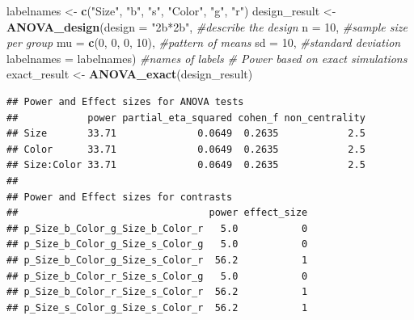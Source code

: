 \documentclass[]{book}
\newenvironment{Shaded}{\begin{snugshade}}{\end{snugshade}}
\newcommand{\CommentTok}[1]{\textcolor[rgb]{0.56,0.35,0.01}{\textit{#1}}}
\newcommand{\DataTypeTok}[1]{\textcolor[rgb]{0.13,0.29,0.53}{#1}}
\newcommand{\DecValTok}[1]{\textcolor[rgb]{0.00,0.00,0.81}{#1}}
\newcommand{\KeywordTok}[1]{\textcolor[rgb]{0.13,0.29,0.53}{\textbf{#1}}}
\newcommand{\NormalTok}[1]{#1}
\newcommand{\OperatorTok}[1]{\textcolor[rgb]{0.81,0.36,0.00}{\textbf{#1}}}
\newcommand{\StringTok}[1]{\textcolor[rgb]{0.31,0.60,0.02}{#1}}
\begin{document}
\begin{Shaded}
\begin{Highlighting}[]
\NormalTok{labelnames <-}\StringTok{ }\KeywordTok{c}\NormalTok{(}\StringTok{"Size"}\NormalTok{, }\StringTok{"b"}\NormalTok{, }\StringTok{"s"}\NormalTok{, }\StringTok{"Color"}\NormalTok{, }\StringTok{"g"}\NormalTok{, }\StringTok{"r"}\NormalTok{)}
\NormalTok{design_result <-}\StringTok{ }\KeywordTok{ANOVA_design}\NormalTok{(}\DataTypeTok{design =} \StringTok{"2b*2b"}\NormalTok{, }\CommentTok{#describe the design}
                              \DataTypeTok{n =} \DecValTok{10}\NormalTok{, }\CommentTok{#sample size per group }
                              \DataTypeTok{mu =} \KeywordTok{c}\NormalTok{(}\DecValTok{0}\NormalTok{, }\DecValTok{0}\NormalTok{, }\DecValTok{0}\NormalTok{, }\DecValTok{10}\NormalTok{), }\CommentTok{#pattern of means}
                              \DataTypeTok{sd =} \DecValTok{10}\NormalTok{, }\CommentTok{#standard deviation}
                              \DataTypeTok{labelnames =}\NormalTok{ labelnames) }\CommentTok{#names of labels}
\CommentTok{# Power based on exact simulations}
\NormalTok{exact_result <-}\StringTok{ }\KeywordTok{ANOVA_exact}\NormalTok{(design_result)}
\end{Highlighting}
\end{Shaded}

\begin{verbatim}
## Power and Effect sizes for ANOVA tests
##            power partial_eta_squared cohen_f non_centrality
## Size       33.71              0.0649  0.2635            2.5
## Color      33.71              0.0649  0.2635            2.5
## Size:Color 33.71              0.0649  0.2635            2.5
## 
## Power and Effect sizes for contrasts
##                                 power effect_size
## p_Size_b_Color_g_Size_b_Color_r   5.0           0
## p_Size_b_Color_g_Size_s_Color_g   5.0           0
## p_Size_b_Color_g_Size_s_Color_r  56.2           1
## p_Size_b_Color_r_Size_s_Color_g   5.0           0
## p_Size_b_Color_r_Size_s_Color_r  56.2           1
## p_Size_s_Color_g_Size_s_Color_r  56.2           1
\end{verbatim}

\begin{Shaded}
\end{Shaded}
\end{document}
